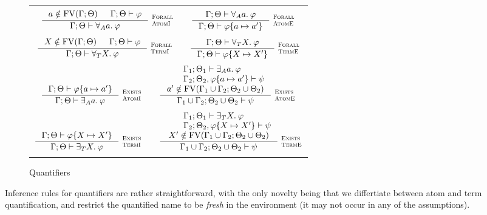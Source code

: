 \documentclass[english, mgr]{iithesis}
\renewcommand{\it}[1]{\textit{#1}}
\newcommand{\scbrk}[2]{\myatop{\textsc{#1}}{\textsc{#2}}}
\begin{document}
\begin{figure}[htbp]
  \centering
  \begin{tabularx}{\textwidth}{|C|}
  \hline \\ $
  \inference{
    \atomv \notin \fv[\cEnv;\Theta] &
    \jgmnt[\cEnv;\Theta]{\formphi}
  }{
    \jgmnt[\cEnv;\Theta]{\fForallAtom{\atomv}\formphi}
  }\:\scbrk{Forall}{AtomI}
  \qquad
  \inference{
    \jgmnt[\cEnv;\Theta]{\fForallAtom{\atomv}\formphi}
  }{
    \jgmnt[\cEnv;\Theta]{\formphi \{\atomv \mapsto \atomv'\}}
  }\:\scbrk{Forall}{AtomE}
  $ \\ \\ $
  \inference{
    \termv \notin \fv[\cEnv;\Theta] &
    \jgmnt[\cEnv;\Theta]{\formphi}
  }{
    \jgmnt[\cEnv;\Theta]{\fForallTerm{\termv}\formphi}
  }\:\scbrk{Forall}{TermI}
  \qquad
  \inference{
    \jgmnt[\cEnv;\Theta]{\fForallTerm{\termv}\formphi}
  }{
    \jgmnt[\cEnv;\Theta]{\formphi \{\termv \mapsto \termv'\}}
  }\:\scbrk{Forall}{TermE}
  $ \\ \\ $
  \inference{
    \jgmnt[\cEnv;\Theta]{\formphi \{\atomv \mapsto \atomv'\}}
    }{
    \jgmnt[\cEnv;\Theta]{\fExistsAtom{\atomv}\formphi}
  }\:\scbrk{Exists}{AtomI}
  \qquad
  \inference{
    \qquad \jgmnt[\cEnv_1;\Theta_1]{\fExistsAtom{\atomv}\formphi} \hfill \\
    \qquad \jgmnt[\cEnv_2;\Theta_2,\formphi \{\atomv \mapsto \atomv'\}]{\psi} \hfill \\
    \atomv' \notin \fv[\cEnv_1 \cup \cEnv_2;\Theta_2 \cup \Theta_2]
    }{
    \jgmnt[\cEnv_1 \cup \cEnv_2;\Theta_2 \cup \Theta_2]{\psi}
  }\:\scbrk{Exists}{AtomE}
  $ \\ \\ $
  \inference{
    \jgmnt[\cEnv;\Theta]{\formphi \{\termv \mapsto \termv'\}}
    }{
    \jgmnt[\cEnv;\Theta]{\fExistsTerm{\termv}\formphi}
  }\:\scbrk{Exists}{TermI}
  \qquad
  \inference{
    \qquad \jgmnt[\cEnv_1;\Theta_1]{\fExistsTerm{\termv}\formphi} \hfill \\
    \qquad \jgmnt[\cEnv_2;\Theta_2,\formphi \{\termv \mapsto \termv'\}]{\psi} \hfill \\
    \termv' \notin \fv[\cEnv_1 \cup \cEnv_2;\Theta_2 \cup \Theta_2]
    }{
    \jgmnt[\cEnv_1 \cup \cEnv_2;\Theta_2 \cup \Theta_2]{\psi}
  }\:\scbrk{Exists}{TermE}
  $ \\ \\ \hline
  \end{tabularx}
  \caption{Quantifiers}
  \label{fig:quantifiers}
\end{figure}
Inference rules for quantifiers are rather straightforward,
with the only novelty being that we differtiate between atom and term
quantification, and restrict the quantified name to be \it{fresh} in the environment (it may not occur in any of the assumptions).
\end{document}
